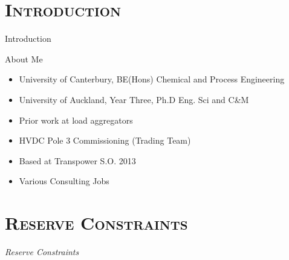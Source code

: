 \documentclass[xcolor=x11names,compress]{beamer}
\renewcommand{\(}{\begin{columns}}
\renewcommand{\)}{\end{columns}}
\newcommand{\<}[1]{\begin{column}{#1}}
\renewcommand{\>}{\end{column}}
\begin{document}
\section{\scshape Introduction}

\begin{frame}{Introduction}
\tableofcontents
\end{frame}

\begin{frame}{About Me}
\begin{itemize}
\item University of Canterbury, BE(Hons) Chemical and Process Engineering
\item University of Auckland, Year Three, Ph.D Eng. Sci and C\&M
\item Prior work at load aggregators
\item HVDC Pole 3 Commissioning (Trading Team)
\item Based at Transpower S.O. 2013
\item Various Consulting Jobs
\end{itemize}
\end{frame}


\section{\scshape Reserve Constraints}
\begin{frame}
\vspace{1.5cm}
\begin{center}
{\Huge\textit{Reserve Constraints}}
\end{center}
\end{frame}
\end{document}
